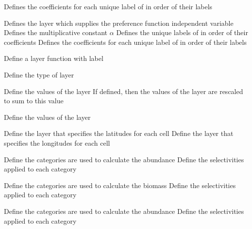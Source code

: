  {Defines the coefficients for each unique label of  in order of their labels}
\par\textbf{}\par
{} {Defines the layer which supplies the preference function independent variable}
 {Defines the multiplicative constant $\alpha$}
 {Defines the unique labels of  in order of their coefficients}
 {Defines the coefficients for each unique label of  in order of their labels}
\par{} {Define a layer function with label}\par
{} {Define the type of layer}
\par\textbf{}\par
{} {Define the values of the layer}
 {If defined, then the values of the layer are rescaled to sum to this value}
\par\textbf{}\par
{} {Define the values of the layer}
\par\textbf{}\par
\par\textbf{}\par
{} {Define the layer that specifies the latitudes for each cell}
 {Define the layer that specifies the longitudes for each cell}
\par\textbf{}\par
{} {Define the categories are used to calculate the abundance}
 {Define the selectivities applied to each category}
\par\textbf{}\par
{} {Define the categories are used to calculate the biomass}
 {Define the selectivities applied to each category}
\par\textbf{}\par
{} {Define the categories are used to calculate the abundance}
 {Define the selectivities applied to each category}

